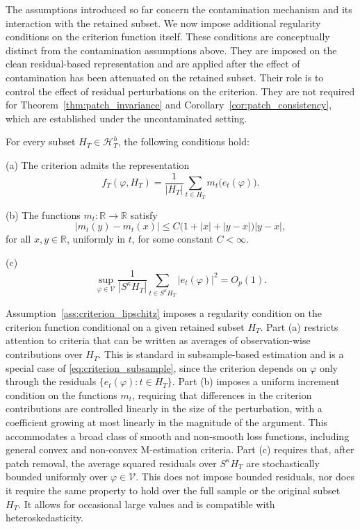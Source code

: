 \documentclass[12pt]{article}
\numberwithin{equation}{section}
\begin{document}
The assumptions introduced so far concern the contamination mechanism and its interaction with the retained subset. 
We now impose additional regularity conditions on the criterion function itself. 
These conditions are conceptually distinct from the contamination assumptions above. 
They are imposed on the clean residual-based representation and are applied after the effect of contamination has been attenuated on the retained subset. 
Their role is to control the effect of residual perturbations on the criterion.
They are not required for Theorem~\ref{thm:patch_invariance} and Corollary~\ref{cor:patch_consistency}, which are established under the uncontaminated setting.

\begin{assumption}\label{ass:criterion_lipschitz}
For every subset $H_T \in \mathcal H_T^h$, the following conditions hold:

\noindent
(a) The criterion admits the representation
\begin{equation}
f_T(\varphi,H_T)
=
\frac{1}{|H_T|}
\sum_{t\in H_T} m_t\bigl(e_t(\varphi)\bigr).
\end{equation}

\noindent
(b) The functions $m_t:\mathbb R \to \mathbb R$ satisfy
\begin{equation}
|m_t(y)-m_t(x)|
\le
C\bigl(1+|x|+|y-x|\bigr)|y-x|,
\end{equation}
for all $x,y\in\mathbb R$, uniformly in $t$, for some constant $C<\infty$.

\noindent
(c)
\begin{equation}
\sup_{\varphi\in\mathcal V}
\frac{1}{|S^\kappa H_T|}
\sum_{t\in S^\kappa H_T}|e_t(\varphi)|^2
= O_p(1).
\end{equation}
\end{assumption}

Assumption~\ref{ass:criterion_lipschitz} imposes a regularity condition on the criterion function conditional on a given retained subset $H_T$. 
Part (a) restricts attention to criteria that can be written as averages of observation-wise contributions over $H_T$. 
This is standard in subsample-based estimation and is a special case of \eqref{eq:criterion_subsample}, since the criterion depends on $\varphi$ only through the residuals $\{e_t(\varphi): t \in H_T\}$. 
Part (b) imposes a uniform increment condition on the functions $m_t$, requiring that differences in the criterion contributions are controlled linearly in the size of the perturbation, with a coefficient growing at most linearly in the magnitude of the argument. 
This accommodates a broad class of smooth and non-smooth loss functions, including general convex and non-convex M-estimation criteria. 
Part (c) requires that, after patch removal, the average squared residuals over $S^\kappa H_T$ are stochastically bounded uniformly over $\varphi \in \mathcal V$. 
This does not impose bounded residuals, nor does it require the same property to hold over the full sample or the original subset $H_T$. 
It allows for occasional large values and is compatible with heteroskedasticity.
\end{document}
